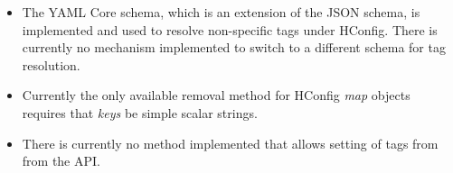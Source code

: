 
\begin{itemize}
\item The YAML Core schema, which is an extension of the JSON schema, is
  implemented and used to resolve non-specific tags under HConfig.
  There is currently no mechanism implemented to switch to a different schema
  for tag resolution.
\item Currently the only available removal method for HConfig {\em map}
  objects requires that {\em keys} be simple scalar strings.
\item There is currently no method implemented that allows setting of tags from
  from the API.
\end{itemize}
